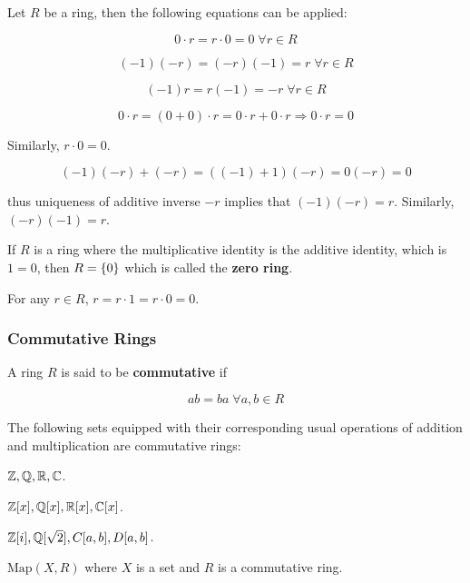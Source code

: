 \documentclass[a4paper,12pt]{article}
\begin{document}
\begin{pst}
  Let $R$ be a ring, then the following equations can be applied:

  \begin{alist}
    \item

    $$0\cdot r=r\cdot 0=0\;\forall r\in R$$

    \item

    $$(-1)(-r)=(-r)(-1)=r\;\forall r\in R$$

    \item

    $$(-1)r=r(-1)=-r\;\forall r\in R$$
  \end{alist}

  \prf {}

  $$0\cdot r=(0+0)\cdot r=0\cdot r+0\cdot r\Rightarrow 0\cdot r=0$$\s

  Similarly, $r\cdot 0=0$.\n

  \propdisp


  $$(-1)(-r)+(-r)=((-1)+1)(-r)=0(-r)=0$$\s

  thus uniqueness of additive inverse $-r$ implies that $(-1)(-r)=r$. Similarly, $(-r)(-1)=r$.
\end{pst}\n

\begin{pst}
  If $R$ is a ring where the multiplicative identity is the additive identity, which is $1=0$, then $R=\left\{ 0\right\}$ which is called the \textbf{zero ring}.\n

  \prf For any $r\in R$, $r=r\cdot 1=r\cdot 0=0$.
\end{pst}

\subsubsection{Commutative Rings}
\begin{dft}
  A ring $R$ is said to be \textbf{commutative} if

  $$ab=ba\;\forall a,b\in R$$
\end{dft}\n

\begin{exm}
  The following sets equipped with their corresponding usual operations of addition and multiplication are commutative rings:

  \begin{alist}
    \item $\mathbb{Z},\mathbb{Q},\mathbb{R},\mathbb{C}$.
    \item $\mathbb{Z}[x],\mathbb{Q}[x],\mathbb{R}[x],\mathbb{C}[x]$.
    \item $\mathbb{Z}[i],\mathbb{Q}[\sqrt{2}],C[a,b],D[a,b]$.
    \item $\mathrm{Map}(X,R)$ where $X$ is a set and $R$ is a commutative ring.
  \end{alist}
\end{exm}
\end{document}
